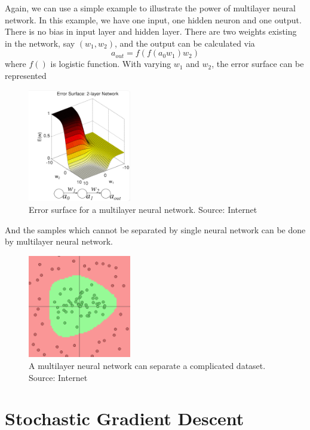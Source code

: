 Again, we can use a simple example to illustrate the power of multilayer neural network. In this example, we have one input, one hidden neuron and one output. There is no bias in input layer and hidden layer. There are two weights existing in the network, say $(w_{1}, w_{2})$, and the output can be calculated via
\begin{equation}\label{eq:2LayerExample}
a_{out} = f(f(a_{0}w_{1})w_{2})
\end{equation}
where $f()$ is logistic function. With varying $w_{1}$ and $w_{2}$, the error surface can be represented
\graphicspath{ {./Figures/} }
\begin{figure}[!htb]
\centering
\includegraphics[width=0.4\textwidth]{2LayerErrorSurface.png}
\caption{\label{fig:2LayerErrorSurface}Error surface for a multilayer neural network. Source: Internet}
\end{figure}
And the samples which cannot be separated by single neural network can be done by multilayer neural network.
\graphicspath{ {./Figures/} }
\begin{figure}[!htb]
\centering
\includegraphics[width=0.4\textwidth]{MultiLayerCircleData.png}
\caption{\label{fig:2LayerErrorSurface}A multilayer neural network can separate a complicated dataset. Source: Internet}
\end{figure}

\section{Stochastic Gradient Descent}

